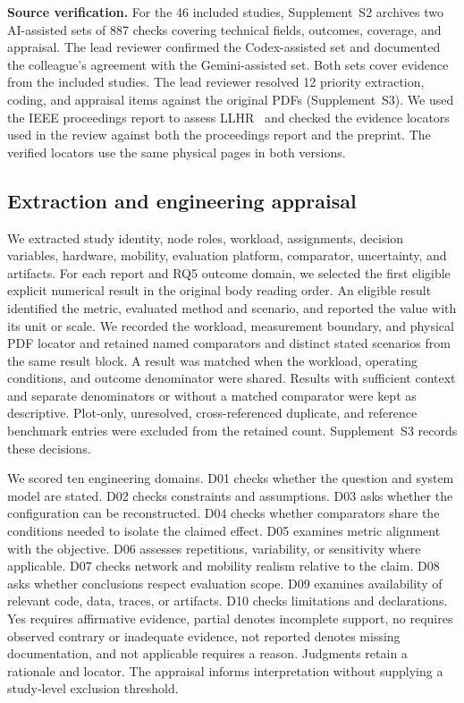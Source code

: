 \documentclass[journal]{IEEEtran}
\begin{document}
\textbf{Source verification.} For the 46 included studies, Supplement~S2 archives two AI-assisted sets of 887 checks covering technical fields, outcomes, coverage, and appraisal. The lead reviewer confirmed the Codex-assisted set and documented the colleague's agreement with the Gemini-assisted set. Both sets cover evidence from the included studies. The lead reviewer resolved 12 priority extraction, coding, and appraisal items against the original PDFs (Supplement~S3). We used the IEEE proceedings report to assess LLHR~\cite{R0082} and checked the evidence locators used in the review against both the proceedings report and the preprint. The verified locators use the same physical pages in both versions.

\subsection{Extraction and engineering appraisal}
We extracted study identity, node roles, workload, assignments, decision variables, hardware, mobility, evaluation platform, comparator, uncertainty, and artifacts. For each report and RQ5 outcome domain, we selected the first eligible explicit numerical result in the original body reading order. An eligible result identified the metric, evaluated method and scenario, and reported the value with its unit or scale. We recorded the workload, measurement boundary, and physical PDF locator and retained named comparators and distinct stated scenarios from the same result block. A result was matched when the workload, operating conditions, and outcome denominator were shared. Results with sufficient context and separate denominators or without a matched comparator were kept as descriptive. Plot-only, unresolved, cross-referenced duplicate, and reference benchmark entries were excluded from the retained count. Supplement~S3 records these decisions.

We scored ten engineering domains. D01 checks whether the question and system model are stated. D02 checks constraints and assumptions. D03 asks whether the configuration can be reconstructed. D04 checks whether comparators share the conditions needed to isolate the claimed effect. D05 examines metric alignment with the objective. D06 assesses repetitions, variability, or sensitivity where applicable. D07 checks network and mobility realism relative to the claim. D08 asks whether conclusions respect evaluation scope. D09 examines availability of relevant code, data, traces, or artifacts. D10 checks limitations and declarations. Yes requires affirmative evidence, partial denotes incomplete support, no requires observed contrary or inadequate evidence, not reported denotes missing documentation, and not applicable requires a reason. Judgments retain a rationale and locator. The appraisal informs interpretation without supplying a study-level exclusion threshold.
\end{document}
